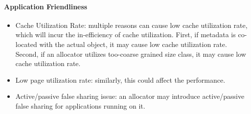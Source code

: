 \paragraph{Application Friendliness}
\begin{itemize}
\item Cache Utilization Rate: multiple reasons can cause low cache utilization rate, which will incur the in-efficiency of cache utilization. First, if metadata is co-located with the actual object, it may cause low cache utilization rate. Second, if an allocator utilizes too-coarse grained size class, it may cause low cache utilization rate.   
\item Low page utilization rate: similarly, this could affect the performance. 
\item Active/passive false sharing issue: an allocator may introduce active/passive false sharing for applications running on it. 
\end{itemize}


